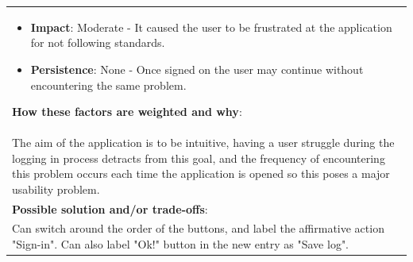 \documentclass[pdftex,12pt,a4paper]{report}
\begin{document}
\begin{center}
\begin{longtable}{|p{\textwidth}|}
\begin{itemize}
	\item{\textbf{Impact}:} Moderate - It caused the user to be frustrated at the application for not following standards.
	\item{\textbf{Persistence}:} None - Once signed on the user may continue without encountering the same problem.
	\end{itemize}
	\textbf{How these factors are weighted and why}:\\
	The aim of the application is to be intuitive, having a user struggle during the logging in process detracts from this goal, and the frequency of encountering this problem occurs each time the application is opened so this poses a major usability problem.\\
	\hline
	\textbf{Possible solution and/or trade-offs}:\\
Can switch around the order of the buttons, and label the affirmative action "Sign-in". Can also label "Ok!" button in the new entry as "Save log".\\
	\hline
	\end{longtable}
\end{center}
\end{document}
